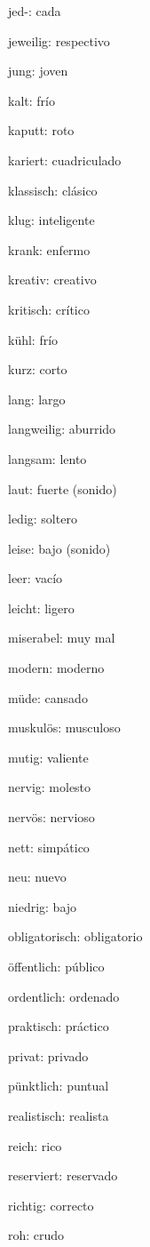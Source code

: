 \begin{multicols}{2}
\begin{myitemize}
\item jed-: cada
\item jeweilig: respectivo
\item jung: joven
\item kalt: frío
\item kaputt: roto
\item kariert: cuadriculado
\item klassisch: clásico
\item klug: inteligente
\item krank: enfermo
\item kreativ: creativo
\item kritisch: crítico
\item kühl: frío
\item kurz: corto
\item lang: largo
\item langweilig: aburrido
\item langsam: lento
\item laut: fuerte (sonido)
\item ledig: soltero
\item leise: bajo (sonido)
\item leer: vacío
\item leicht: ligero
\item miserabel: muy mal
\item modern: moderno
\item müde: cansado
\item muskulös: musculoso
\item mutig: valiente
\item nervig: molesto
\item nervös: nervioso
\item nett: simpático
\item neu: nuevo
\item niedrig: bajo
\item obligatorisch: obligatorio
\item öffentlich: público
\item ordentlich: ordenado
\item praktisch: práctico
\item privat: privado
\item pünktlich: puntual
\item realistisch: realista
\item reich: rico
\item reserviert: reservado
\item richtig: correcto
\item roh: crudo

\end{myitemize}
\end{multicols}
